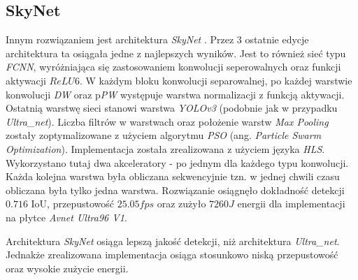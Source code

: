 \subsection{SkyNet}
Innym rozwiązaniem jest architektura \emph{SkyNet} \cite{skynet}. 
Przez 3 ostatnie edycje architektura ta osiągała jedne z najlepszych wyników.
Jest to również sieć typu \emph{FCNN}, wyróżniająca się zastosowaniem konwolucji seperowalnych oraz funkcji aktywacji $ReLU6$.
W każdym bloku konwolucji separowalnej, po każdej warstwie konwolucji \emph{DW} oraz p\emph{PW}  występuje warstwa normalizacji z funkcją aktywacji.
Ostatnią warstwę sieci stanowi warstwa \emph{YOLOv3} (podobnie jak w przypadku \emph{Ultra\_net}).
Liczba filtrów w warstwach oraz położenie warstw \textit{Max Pooling} zostały zoptymalizowane z użyciem algorytmu \emph{PSO} (ang. \emph{Particle Swarm Optimization}).
Implementacja została zrealizowana z użyciem języka \emph{HLS}.
Wykorzystano tutaj dwa akceleratory - po jednym dla każdego typu konwolucji.
Każda kolejna warstwa była obliczana sekwencyjnie tzn. w jednej chwili czasu obliczana była tylko jedna warstwa.  
Rozwiązanie osiągnęło dokładność detekcji $0.716$ IoU, przepustowość $25.05 fps$ oraz zużyło $7260 J$ energii dla implementacji na płytce \emph{Avnet Ultra96 V1}. 

Architektura \emph{SkyNet} osiąga lepszą jakość detekcji, niż architektura \emph{Ultra\_net}. 
Jednakże zrealizowana implementacja osiąga stosunkowo niską przepustowość oraz wysokie zużycie energii.



